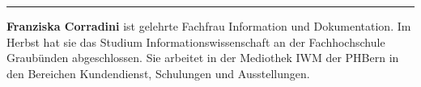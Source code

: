 \begin{center}\rule{0.5\linewidth}{0.5pt}\end{center}

\textbf{Franziska Corradini} ist gelehrte Fachfrau Information und
Dokumentation. Im Herbst hat sie das Studium Informationswissenschaft an
der Fachhochschule Graubünden abgeschlossen. Sie arbeitet in der
Mediothek IWM der PHBern in den Bereichen Kundendienst, Schulungen und
Ausstellungen.
